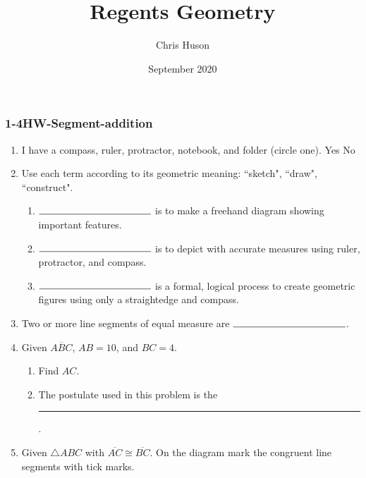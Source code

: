 \documentclass[12pt, twoside]{article}
\title{Regents Geometry}
\author{Chris Huson}
\date{September 2020}
\begin{document}
\subsubsection*{1-4HW-Segment-addition}
\begin{enumerate}
\item I have a compass, ruler, protractor, notebook, and folder (circle one). Yes \qquad No

\item Use each term according to its geometric meaning: ``sketch", ``draw", ``construct".
    \begin{enumerate}
      \item $\rule{4cm}{0.15mm}$ is to make a freehand diagram showing important features. \smallskip
      \item $\rule{4cm}{0.15mm}$ is to depict with accurate measures using ruler, protractor, and compass. \smallskip
      \item $\rule{4cm}{0.15mm}$ is a formal, logical process to create geometric figures using only a straightedge and compass.
    \end{enumerate} \smallskip

\item Two or more line segments of equal measure are $\rule{4cm}{0.15mm}$.
    \bigskip
\item Given $\overline{ABC}$, $AB=10$, and $BC=4$.
  \begin{enumerate}
    \item Find ${AC}$.\\[0.75cm]
       \smallskip
    \item The postulate used in this problem is the \rule{6cm}{0.15mm}.
  \end{enumerate}
  \smallskip

\item Given $\triangle ABC$ with $\overline{AC} \cong \overline{BC}$. On the diagram mark the congruent line segments with tick marks.
  \begin{center}
  \end{center}


\end{enumerate}
\end{document}
